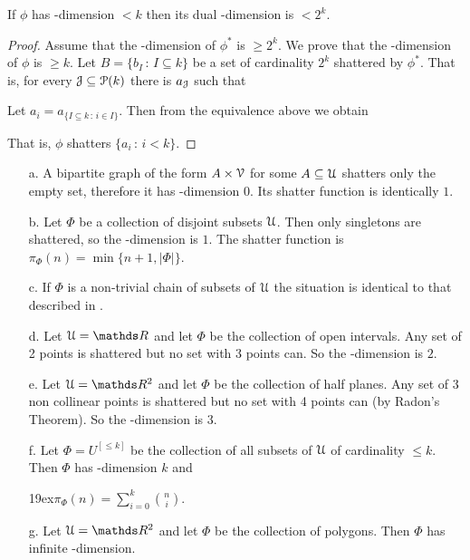 \documentclass[sputnik.tex]{subfiles}
\begin{document}
\begin{proposition}
If $\phi$ has \vc-dimension $< k$ then its dual \vc-dimension is $< 2^k$.
\end{proposition}

\begin{proof}
Assume that the \vc-dimension of $\phi^*$ is $\ge 2^k$.
We prove that the \vc-dimension of $\phi$ is $\ge k$.
Let $B=\{b_I\,:\,I\subseteq k\}$ be a set of cardinality $2^k$ shattered by $\phi^*$. 
That is, for every $\EuScript J\subseteq \EuScript P(k)$ there is $a_\EuScript J$ such that


Let $a_i=a_{\{I\subseteq k\,:\, i\in I\}}$. Then from the equivalence above we obtain


That is, $\phi$ shatters $\{a_i\,:\,i<k\}$.
\end{proof}

\begin{example}\label{ex_vcdim}
\begin{itemize}
\item[a.] A bipartite graph of the form $A\times\EuScript V$ for some $A\subseteq\EuScript U$ shatters only the empty set, therefore it has \vc-dimension $0$.
Its shatter function is identically $1$.
\item[b.] Let $\Phi$ be a collection of disjoint subsets $\EuScript U$.
Then only singletons are shattered, so the \vc-dimension is $1$.
The shatter function is $\pi_\Phi(n)=\min\big\{n+1,|\Phi|\big\}$.
\item[c.] If $\Phi$ is a non-trivial chain of subsets of $\EuScript U$ the situation is identical to that described in .
\item[d.] Let $\U=\RR$ and let $\Phi$ be the collection of open intervals.
Any set of 2 points is shattered but no set with 3 points can.
So the \vc-dimension is $2$.
\item[e.] Let $\U=\RR^2$ and let $\Phi$ be the collection of half planes.
Any set of 3 non collinear points is shattered but no set with 4 points can (by Radon's Theorem).
So the \vc-dimension is $3$.
\item[f.] Let $\Phi=U^{[\le k]}$ be the collection of all subsets of $\EuScript U$ of cardinality $\le k$.
Then $\Phi$ has \vc-dimension $k$ and

\noindent\kern19ex$\displaystyle\pi_\Phi(n)=\sum^k_{i=0} \binom{n}{i}$.


\item[g.] Let $\U=\RR^2$ and let $\Phi$ be the collection of polygons.
Then $\Phi$ has infinite \vc-dimension.\QED
\end{itemize}
\end{example}
\end{document}
